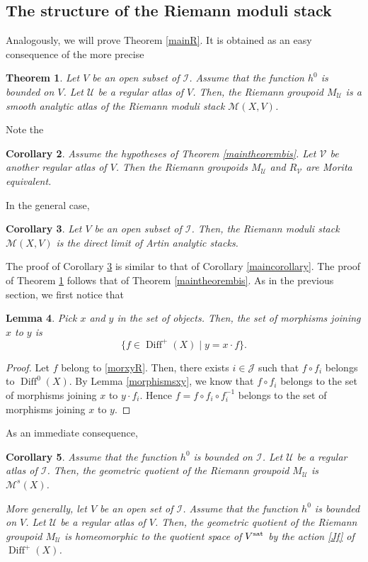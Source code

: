 \documentclass[JEP,XML,SOM,Unicode]{cedram}
\let\mathcal\mathscr
\DeclareMathOperator{\Diff}{Diff}
\theoremstyle{plain}
\newtheorem{theorem}{Theorem}[section]
\newtheorem{corollary}[theorem]{Corollary}
\newtheorem{lemma}[theorem]{Lemma}
\theoremstyle{definition}
\theoremstyle{remark}
\numberwithin{equation}{section}
\newcommand{\cI}{\mathcal{I}}
\begin{document}
\subsection{The structure of the Riemann moduli stack}
\label{mainRiemann}
Analogously, we will prove Theorem \ref{mainR}. It is obtained as an easy consequence of the more precise
\begin{theorem}
\label{mainRbis}
Let $V$ be an open subset of $\cI$. Assume that the function $h^0$ is bounded on $V$. Let $\mathcal U$ be a regular atlas of $V$. Then, the Riemann groupoid $M_{\mathcal U}$ is a smooth analytic atlas of the Riemann moduli stack $\mathcal M(X,V)$.
\end{theorem}
Note the
\begin{corollary}
\label{RiemMoritaind}
Assume the hypotheses of Theorem \ref{maintheorembis}. Let $\mathcal V$ be another regular atlas of $V$. Then the Riemann groupoids $M_{\mathcal U}$ and $R_\mathcal V$ are Morita equivalent.
\end{corollary}

In the general case,

\begin{corollary}
\label{maincorollaryR}
Let $V$ be an open subset of $\cI$. Then, the Riemann moduli stack $\mathcal M(X,V)$ is the direct limit of Artin analytic stacks.
\end{corollary}

The proof of Corollary \ref{maincorollaryR} is similar to that of Corollary \ref{maincorollary}. The proof of Theorem \ref{mainRbis} follows that of Theorem \ref{maintheorembis}.
As in the previous section, we first notice that

\begin{lemma}
\label{morphismsxyR}
Pick $x$ and $y$ in the set of objects. Then, the set of morphisms joining $x$ to $y$ is
\begin{equation}
\label{morxyR}
\{f\in\Diff^+(X)\mid y=x\cdot f\}.
\end{equation}
\end{lemma}

\begin{proof}
Let $f$ belong to \eqref{morxyR}. Then, there exists $i\in\mathcal J$ such that $f\circ f_i$ belongs to $\Diff^0(X)$. By Lemma \ref{morphismsxy}, we know that
$f\circ f_i$ belongs to the set of morphisms joining $x$ to $y\cdot f_i$. Hence $f=f\circ f_i\circ f_i^{-1}$ belongs to the set of morphisms joining
$x$ to $y$.
\end{proof}
As an immediate consequence,
\begin{corollary}
\label{geoquotientR}
Assume that the function $h^0$ is bounded on $\cI$. Let $\mathcal U$ be a regular atlas of $\cI$. Then, the geometric quotient of the Riemann groupoid $M_{\mathcal U}$ is $\mathcal M^s(X)$.

More generally, let $V$ be an open set of $\cI$. Assume that the function $h^0$ is bounded on $V$. Let $\mathcal U$ be a regular atlas of $V$. Then, the geometric quotient of the Riemann groupoid $M_{\mathcal U}$ is homeomorphic to the quotient space of $V^{\textup{sat}}$ by the action \eqref{Jf} of $\Diff^+(X)$.
\end{corollary}
\end{document}
